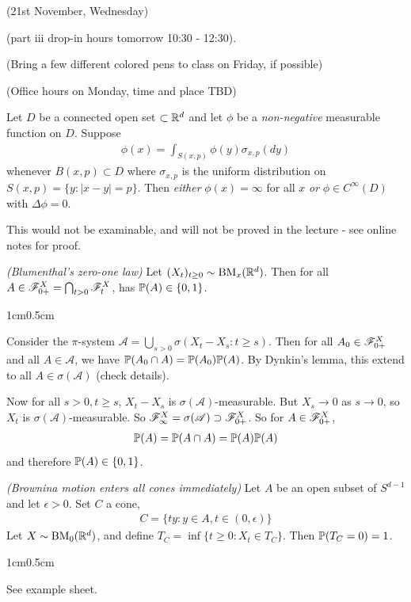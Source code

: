 \documentclass[12pt,a4paper]{report}
\newenvironment{proof}
{\begin{changemargin}{1cm}{0.5cm} 
	}%
	{\end{changemargin}
}
\begin{document}
\newday

(21st November, Wednesday)
\s

(part iii drop-in hours tomorrow 10:30 - 12:30).

(Bring a few different colored pens to class on Friday, if possible)

(Office hours on Monday, time and place TBD)
\s

 Let $D$ be a connected open set $\subset \mathbb{R}^d$ and let $\phi$ be a \emph{non-negative} measurable function on $D$. Suppose
\begin{align*}
\phi(x) = \int_{S(x,p)} \phi(y) \sigma_{x,p}(dy)
\end{align*}
whenever $B(x,p) \subset D$ where $\sigma_{x,p}$ is the uniform distribution on $S(x,p) = \{ y : |x-y| =p \}$. Then \emph{either} $\phi(x) = \infty$ for all $x$ \emph{or} $\phi \in C^{\infty}(D)$ with $\Delta \phi =0$.
\s

This would not be examinable, and will not be proved in the lecture - see online notes for proof.
\s

 \emph{(Blumenthal's zero-one law)} Let $(X_t)_{t\geq 0} \sim \text{BM}_x(\mathbb{R}^d)$. Then for all $A\in \mathscr{F}_{0+}^{X} = \bigcap_{t>0} \mathscr{F}_{t}^X$, has $\mathbb{P}(A) \in \{ 0,1\}$.
\begin{proof}
\pf Consider the $\pi$-system $\mathscr{A} = \bigcup_{s>0} \sigma (X_t - X_s : t\geq s)$. Then for all $A_0 \in \mathscr{F}_{0+}^X$ and all $A \in \mathscr{A}$, we have $\mathbb{P}(A_0 \cap A) = \mathbb{P}(A_0) \mathbb{P}(A)$. By Dynkin's lemma, this extend to all $A\in \sigma(\mathscr{A})$ (check details).

Now for all $s>0, t\geq s$, $X_t - X_s$ is $\sigma(\mathscr{A})$-measurable. But $X_s \rightarrow 0$ as $s\rightarrow 0$, so $X_t$ is $\sigma(\mathscr{A})$-measurable. So $\mathscr{F}_{\infty}^X = \sigma(\mathscr{A}) \supset \mathscr{F}_{0+}^X$. So for $A\in \mathscr{F}_{0+}^X$,
\begin{align*}
\mathbb{P}(A) = \mathbb{P}(A\cap A) = \mathbb{P}(A)\mathbb{P}(A)
\end{align*}
and therefore $\mathbb{P}(A) \in \{0,1\}$.

\eop
\end{proof}
\s

 \emph{(Brownina motion enters all cones immediately)} Let $A$ be an open subset of $S^{d-1}$ and let $\epsilon>0$. Set $C$ a cone,
\begin{align*}
C = \{ty : y\in A, t\in (0,\epsilon) \}
\end{align*} 
Let $X \sim \text{BM}_0(\mathbb{R}^d)$, and define $T_C = \inf \{ t\geq 0: X_t \in T_C \}$. Then $\mathbb{P}(T_C =0)=1$. 
\begin{proof}
See example sheet.
\end{proof}
\s
\end{document}

